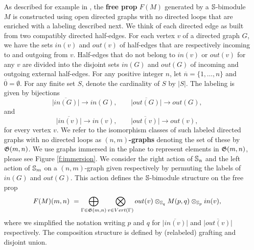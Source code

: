 As described for example in \cite{Markl08, Fresse2010props}, the \textbf{free prop} $F(M)$ generated by a \mbox{$\S$-bimodule} $M$ is constructed using open directed graphs with no directed loops that are enriched with a labeling described next. We think of each directed edge as built from two compatibly directed half-edges. For each vertex $v$ of a directed graph $G$, we have the sets $in(v)$ and $out(v)$ of half-edges that are respectively incoming to and outgoing from $v$. Half-edges that do not belong to $in(v)$ or $out(v)$ for any $v$ are divided into the disjoint sets $in(G)$ and $out(G)$ of incoming and outgoing external half-edges. For any positive integer $n$, let $\overline{n} = \{1,\dots,n\}$ and $\overline{0} = \emptyset$. For any finite set $S$, denote the cardinality of $S$ by $|S|$. The labeling is given by bijections  
\begin{equation*}
\overline{|in(G)|} \to in(G), \qquad
\overline{|out(G)|} \to out(G),
\end{equation*}
and
\begin{equation*}
\overline{|in(v)|}\to in(v), \qquad
\overline{|out(v)|}\to out(v),
\end{equation*}
for every vertex $v$.
We refer to the isomorphism classes of such labeled directed graphs with no directed loops as $(n,m)$\textbf{-graphs} denoting the set of these by $\G(m,n)$.
We use graphs immersed in the plane to represent elements in $\G(m,n)$, please see Figure \ref{f:immersion}.
We consider the right action of $\S_n$ and the left action of $\S_m$ on a $(n,m)$-graph given respectively by permuting the labels of $in(G)$ and $out(G)$. This action defines the $\S$-bimodule structure on the free prop
\begin{equation} \label{e:free prop}
F(M)(m,n) \ = \bigoplus_{\Gamma \in \G(m,n)} \bigotimes_{v \in Vert(\Gamma)} out(v) \otimes_{\S_q} M(p, q) \otimes_{\S_p} in(v),
\end{equation}
where we simplified the notation writing $p$ and $q$ for $\overline{|in(v)|}$ and $\overline{|out(v)|}$ respectively. The composition structure is defined by (relabeled) grafting and disjoint union.



